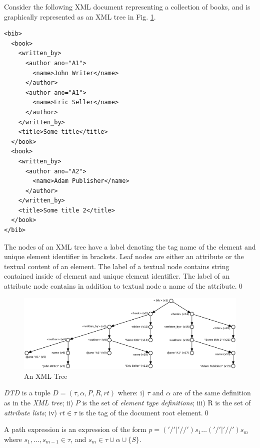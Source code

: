 \begin{example}\label{example1ref}
Consider the following XML document representing a collection of books, and is graphically represented as an XML tree in Fig. \ref{example1}.
\begin{verbatim}
<bib>
  <book>
    <written_by>
      <author ano="A1">
        <name>John Writer</name>
      </author>
      <author ano="A1">
        <name>Eric Seller</name>
      </author>
    </written_by>
    <title>Some title</title>
  </book>
  <book>
    <written_by>
      <author ano="A2">
        <name>Adam Publisher</name>
      </author>
    </written_by>
    <title>Some title 2</title>
  </book>
</bib>
\end{verbatim}

The nodes of an XML tree have a label denoting the tag name of the element and unique element identifier in brackets. Leaf nodes are either an attribute or the textual content of an element. The label of a textual node contains string contained inside of element and unique element identifier. The label of an attribute node contains in addition to textual node a name of the attribute.\qed
\end{example}

\begin{figure}[h]
    \centering\includegraphics[scale=\myscale]{example1-new}
	\caption{An XML Tree} \label{example1}
\end{figure}

\begin{define}[DTD]\label{dtdDef}
{\sl DTD} is a tuple $D = (\tau, \alpha, P, R, rt)$ where: i) $\tau$ and $\alpha$ are of the same definition as in the \emph{XML tree}; ii) $P$ is the set of \emph{element type definitions}; iii) R is the set of \emph{attribute lists}; iv) $rt \in \tau$ is the tag of the document root element.\qed
\end{define}

\begin{define}
A path expression is an expression of the form $p = ('/' | '//')s_1 \dots ('/'|'//')s_m$ where $s_1, \dots, s_{m-1} \in \tau$, and $s_m \in \tau \cup \alpha \cup \{S\}$.
\end{define}

